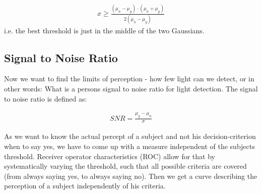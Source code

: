 \documentclass[../main/Notes.tex]{subfiles}
\begin{document}
\begin{align*}
  x \geq \frac{\left(\mu_n-\mu_y\right)\cdot \left(\mu_n+\mu_y\right)}{2\left(\mu_n-\mu_y\right)}
\end{align*}
i.e. the best threshold is just in the middle of the two Gaussians.

\subsection{Signal to Noise Ratio}

Now we want to find the limits of perception - how few light can we detect, or in other words: What is a persons signal to noise ratio for light detection.
The signal to noise ratio is defined as:

\begin{align*}
SNR = \frac{\mu_y-\mu_n}{\sigma}  
\end{align*} 

As we want to know the actual percept of a subject and not his decision-criterion when to say yes, we have to come up with a measure independent of the subjects threshold.
Receiver operator characteristics (ROC) allow for that by systematically varying the threshold, such that all possible criteria are covered (from always saying yes, to always saying no). Then we get a curve describing the perception of a subject independently of his criteria.




 
\end{document}
